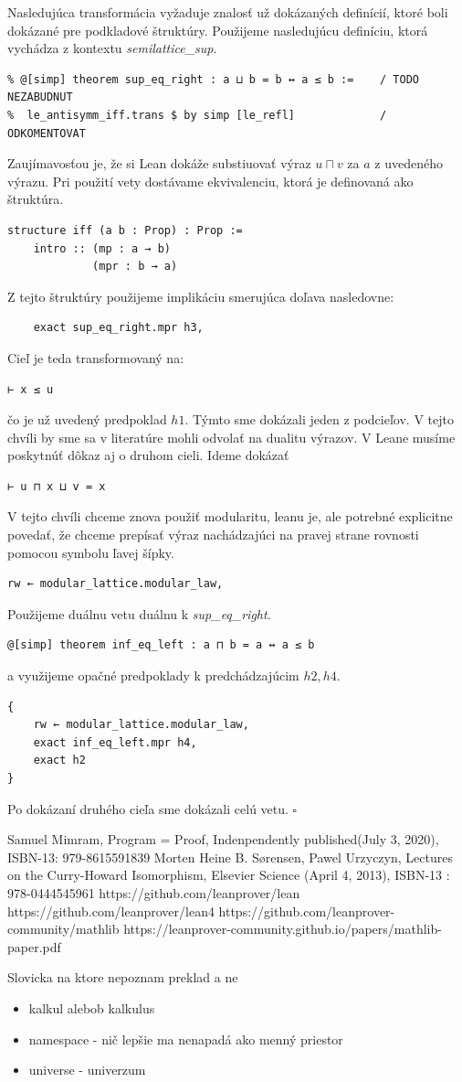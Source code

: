 \documentclass[a4paper,10pt,oneside]{report}%
\begin{document}
    Nasledujúca transformácia vyžaduje znalosť už dokázaných definícií, ktoré
boli dokázané pre podkladové štruktúry. Použijeme nasledujúcu definíciu, ktorá vychádza
z kontextu \emph{semilattice\_sup}.
\begin{lstlisting}
% @[simp] theorem sup_eq_right : a ⊔ b = b ↔ a ≤ b :=    / TODO NEZABUDNUT
%  le_antisymm_iff.trans $ by simp [le_refl]             / ODKOMENTOVAT
    \end{lstlisting}
    Zaujímavosťou je, že si Lean dokáže substiuovať výraz $u \sqcap v$ za $a$ z uvedeného
výrazu. Pri použití vety dostávame ekvivalenciu, ktorá je definovaná ako štruktúra.
\begin{lstlisting}
structure iff (a b : Prop) : Prop :=
    intro :: (mp : a → b)
             (mpr : b → a)
\end{lstlisting}
Z tejto štruktúry použijeme implikáciu smerujúca doľava nasledovne:
\begin{lstlisting}
    exact sup_eq_right.mpr h3,
\end{lstlisting}
    Cieľ je teda transformovaný na:
\begin{lstlisting}
⊢ x ≤ u
\end{lstlisting}
čo je už uvedený predpoklad $h1$. Týmto sme dokázali jeden z podcieľov.
    V tejto chvíli by sme sa v literatúre mohli odvolať na dualitu výrazov.
    V Leane musíme poskytnúť dôkaz aj o druhom cieli. Ideme dokázať
\begin{lstlisting}
⊢ u ⊓ x ⊔ v = x
\end{lstlisting}
V tejto chvíli chceme znova použiť modularitu, leanu je, ale potrebné explicitne povedať,
    že chceme prepísať výraz nachádzajúci na pravej strane rovnosti pomocou symbolu
ľavej šípky.
\begin{lstlisting}
rw ← modular_lattice.modular_law,
\end{lstlisting}
    Použijeme duálnu vetu
    duálnu k \emph{sup\_eq\_right}.
\begin{lstlisting}
@[simp] theorem inf_eq_left : a ⊓ b = a ↔ a ≤ b
\end{lstlisting}
    a využijeme opačné predpoklady k predchádzajúcim $h2, h4$.
\begin{lstlisting}
{
    rw ← modular_lattice.modular_law,
    exact inf_eq_left.mpr h4,
    exact h2
}
\end{lstlisting}

Po dokázaní druhého cieľa sme dokázali celú vetu. $\square$

\begin{thebibliography}{xx}
     Samuel Mimram, Program = Proof, Indenpendently published(July 3, 2020), ISBN-13: 979-8615591839
     Morten Heine B. Sørensen, Pawel Urzyczyn, Lectures on the Curry-Howard Isomorphism,
        Elsevier Science (April 4, 2013),  ISBN-13 : 978-0444545961
     https://github.com/leanprover/lean
     https://github.com/leanprover/lean4
     https://github.com/leanprover-community/mathlib
     https://leanprover-community.github.io/papers/mathlib-paper.pdf
\end{thebibliography}

Slovicka na ktore nepoznam preklad a ne
\begin{itemize}
    \item kalkul alebob kalkulus
    \item namespace - nič lepšie ma nenapadá ako menný priestor
    \item universe - univerzum
\end{itemize}
\end{document}

